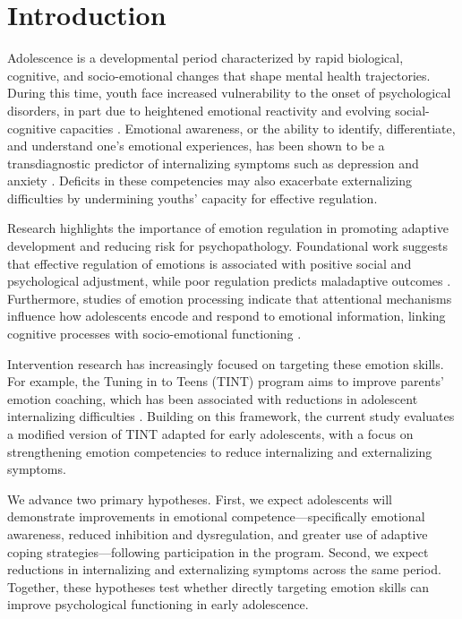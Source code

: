 \section{Introduction}

Adolescence is a developmental period characterized by rapid biological, cognitive, and socio-emotional changes that shape mental health trajectories. During this time, youth face increased vulnerability to the onset of psychological disorders, in part due to heightened emotional reactivity and evolving social-cognitive capacities \citep{jaworska2015adolescent}. Emotional awareness, or the ability to identify, differentiate, and understand one’s emotional experiences, has been shown to be a transdiagnostic predictor of internalizing symptoms such as depression and anxiety \citep{kranzler2016emotional}. Deficits in these competencies may also exacerbate externalizing difficulties by undermining youths’ capacity for effective regulation.

Research highlights the importance of emotion regulation in promoting adaptive development and reducing risk for psychopathology. Foundational work suggests that effective regulation of emotions is associated with positive social and psychological adjustment, while poor regulation predicts maladaptive outcomes \citep{eisenberg2001relations}. Furthermore, studies of emotion processing indicate that attentional mechanisms influence how adolescents encode and respond to emotional information, linking cognitive processes with socio-emotional functioning \citep{brenner2014role}.

Intervention research has increasingly focused on targeting these emotion skills. For example, the Tuning in to Teens (TINT) program aims to improve parents’ emotion coaching, which has been associated with reductions in adolescent internalizing difficulties \citep{kehoe2014tuning}. Building on this framework, the current study evaluates a modified version of TINT adapted for early adolescents, with a focus on strengthening emotion competencies to reduce internalizing and externalizing symptoms.

We advance two primary hypotheses. First, we expect adolescents will demonstrate improvements in emotional competence—specifically emotional awareness, reduced inhibition and dysregulation, and greater use of adaptive coping strategies—following participation in the program. Second, we expect reductions in internalizing and externalizing symptoms across the same period. Together, these hypotheses test whether directly targeting emotion skills can improve psychological functioning in early adolescence.

